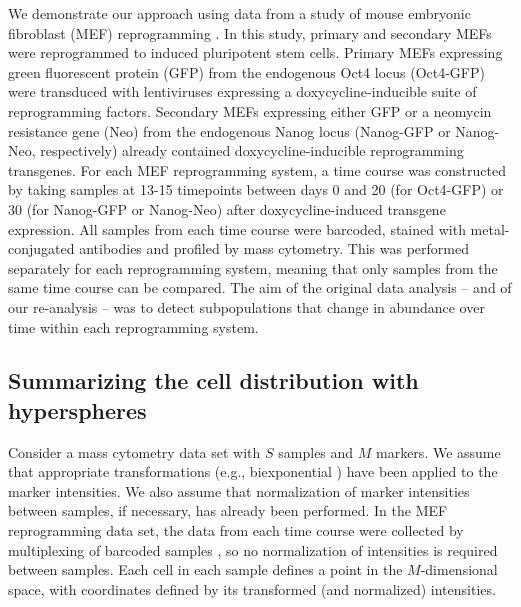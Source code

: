 \documentclass{article}
\begin{document}
We demonstrate our approach using data from a study of mouse embryonic fibroblast (MEF) reprogramming \cite{zunder2015continuous}.
In this study, primary and secondary MEFs were reprogrammed to induced pluripotent stem cells.
Primary MEFs expressing green fluorescent protein (GFP) from the endogenous Oct4 locus (Oct4-GFP) were transduced with lentiviruses expressing a doxycycline-inducible suite of reprogramming factors.
Secondary MEFs expressing either GFP or a neomycin resistance gene (Neo) from the endogenous Nanog locus (Nanog-GFP or Nanog-Neo, respectively) already contained doxycycline-inducible reprogramming transgenes.
For each MEF reprogramming system, a time course was constructed by taking samples at 13-15 timepoints between days 0 and 20 (for Oct4-GFP) or 30 (for Nanog-GFP or Nanog-Neo) after doxycycline-induced transgene expression.
All samples from each time course were barcoded, stained with metal-conjugated antibodies and profiled by mass cytometry.
This was performed separately for each reprogramming system, meaning that only samples from the same time course can be compared.
The aim of the original data analysis -- and of our re-analysis -- was to detect subpopulations that change in abundance over time within each reprogramming system.

\subsection{Summarizing the cell distribution with hyperspheres}
Consider a mass cytometry data set with $S$ samples and $M$ markers.
We assume that appropriate transformations (e.g., biexponential \cite{parks2006new}) have been applied to the marker intensities.
We also assume that normalization of marker intensities between samples, if necessary, has already been performed.
In the MEF reprogramming data set, the data from each time course were collected by multiplexing of barcoded samples \cite{zunder2015palladium}, so no normalization of intensities is required between samples.
Each cell in each sample defines a point in the $M$-dimensional space, with coordinates defined by its transformed (and normalized) intensities.
\end{document}
